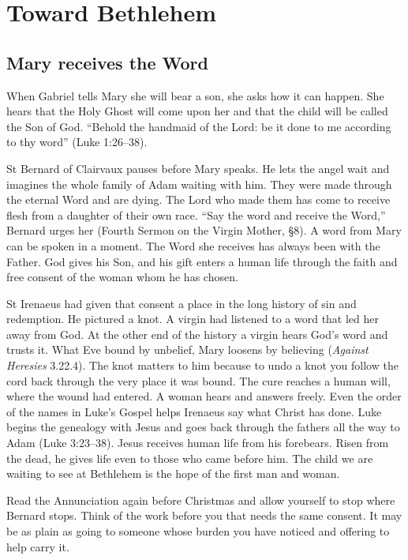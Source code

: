 \section{Toward Bethlehem}

\subsection{Mary receives the Word}
\label{sec:advent-mary-word}

When Gabriel tells Mary she will bear a son, she asks how it can
happen. She hears that the Holy Ghost will come upon her and that
the child will be called the Son of God. “Behold the handmaid of the
Lord: be it done to me according to thy word” (Luke 1:26--38).

St Bernard of Clairvaux pauses before Mary speaks. He lets the angel wait
and imagines the whole family of Adam waiting with him. They were made
through the eternal Word and are dying. The Lord who made them has come
to receive flesh from a daughter of their own race. “Say the word and
receive the Word,” Bernard urges her (Fourth Sermon on the Virgin Mother,
\S8). A word from Mary can be spoken in a moment. The Word she receives
has always been with the Father. God gives his Son, and his gift enters a
human life through the faith and free consent of the woman whom he has
chosen.

St Irenaeus had given that consent a place in the long history of sin and
redemption. He pictured a knot. A virgin had listened to a word that led
her away from God. At the other end of the history a virgin hears God's
word and trusts it. What Eve bound by unbelief, Mary loosens by believing
(\emph{Against Heresies} 3.22.4). The knot matters to him because to
undo a knot you follow the cord back through the very place it was
bound. The cure reaches a human will, where the wound had entered.
A woman hears and answers freely. Even the order of the names in
Luke's Gospel helps Irenaeus say what Christ has done. Luke begins
the genealogy with Jesus and goes back through the fathers all the
way to Adam (Luke 3:23--38). Jesus receives human life from his
forebears. Risen from the dead, he gives life even to those who came
before him. The child we are waiting to see at Bethlehem is the hope
of the first man and woman.

Read the Annunciation again before Christmas
and allow yourself to stop where Bernard stops. Think of the work before
you that needs the same consent. It may be as plain as going to someone
whose burden you have noticed and offering to help carry it.

